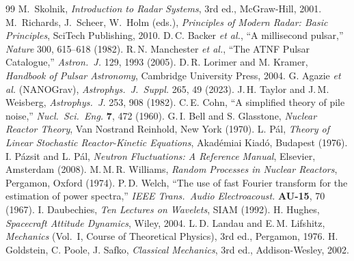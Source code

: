 \documentclass[11pt,a4paper,openany]{book}
\begin{document}
\begin{thebibliography}{99}
 M.~Skolnik, \emph{Introduction to Radar Systems}, 3rd ed., McGraw-Hill, 2001.
 M.~Richards, J.~Scheer, W.~Holm (eds.), \emph{Principles of Modern Radar: Basic Principles}, SciTech Publishing, 2010.
 D.\,C. Backer \emph{et al.}, ``A millisecond pulsar,'' \emph{Nature} 300, 615--618 (1982).
 R.\,N. Manchester \emph{et al.}, ``The ATNF Pulsar Catalogue,'' \emph{Astron.\ J.} 129, 1993 (2005).
 D.\,R. Lorimer and M. Kramer, \emph{Handbook of Pulsar Astronomy}, Cambridge University Press, 2004.
 G. Agazie \emph{et al.} (NANOGrav), \emph{Astrophys.\ J.\ Suppl.} 265, 49 (2023).
 J.\,H. Taylor and J.\,M. Weisberg, \emph{Astrophys.\ J.} 253, 908 (1982).
 C.\,E. Cohn, ``A simplified theory of pile noise,'' \emph{Nucl.\ Sci.\ Eng.} \textbf{7}, 472 (1960).
 G.\,I. Bell and S. Glasstone, \emph{Nuclear Reactor Theory}, Van Nostrand Reinhold, New York (1970).
 L. P\'{a}l, \emph{Theory of Linear Stochastic Reactor-Kinetic Equations}, Akad\'{e}miai Kiad\'{o}, Budapest (1976).
 I. P\'{a}zsit and L. P\'{a}l, \emph{Neutron Fluctuations: A Reference Manual}, Elsevier, Amsterdam (2008).
 M.\,M.\,R. Williams, \emph{Random Processes in Nuclear Reactors}, Pergamon, Oxford (1974).
 P.\,D. Welch, ``The use of fast Fourier transform for the estimation of power spectra,'' \emph{IEEE Trans.\ Audio Electroacoust.} \textbf{AU-15}, 70 (1967).
 I. Daubechies, \emph{Ten Lectures on Wavelets}, SIAM (1992).
 H. Hughes, \emph{Spacecraft Attitude Dynamics}, Wiley, 2004.
 L.\,D. Landau and E.\,M. Lifshitz, \emph{Mechanics} (Vol.\ I, Course of Theoretical Physics), 3rd ed., Pergamon, 1976.
 H. Goldstein, C. Poole, J. Safko, \emph{Classical Mechanics}, 3rd ed., Addison-Wesley, 2002.

\end{thebibliography}
\end{document}
